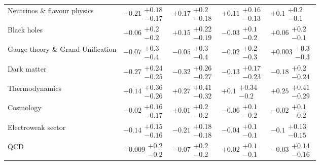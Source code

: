 \begin{table}[H]
\begin{tabular}{lllll}
Neutrinos \& flavour physics & $\bm{+0.21}\substack{+0.18 \\ -0.17}$ & $+0.17\substack{+0.2 \\ -0.18}$ & $+0.11\substack{+0.16 \\ -0.13}$ & $+0.1\substack{+0.2 \\ -0.1}$ \\
Black holes & $+0.06\substack{+0.2 \\ -0.2}$ & $+0.15\substack{+0.22 \\ -0.19}$ & $-0.03\substack{+0.1 \\ -0.2}$ & $+0.06\substack{+0.2 \\ -0.1}$ \\
Gauge theory \& Grand Unification & $-0.07\substack{+0.3 \\ -0.4}$ & $-0.05\substack{+0.3 \\ -0.4}$ & $-0.02\substack{+0.2 \\ -0.3}$ & $+0.003\substack{+0.3 \\ -0.3}$ \\
Dark matter & $\bm{-0.27}\substack{+0.24 \\ -0.25}$ & $\bm{-0.32}\substack{+0.26 \\ -0.27}$ & $-0.13\substack{+0.17 \\ -0.23}$ & $-0.18\substack{+0.2 \\ -0.24}$ \\
Thermodynamics & $+0.14\substack{+0.36 \\ -0.26}$ & $+0.27\substack{+0.41 \\ -0.32}$ & $+0.1\substack{+0.34 \\ -0.2}$ & $+0.25\substack{+0.41 \\ -0.29}$ \\
Cosmology & $-0.02\substack{+0.16 \\ -0.17}$ & $+0.01\substack{+0.2 \\ -0.2}$ & $-0.06\substack{+0.1 \\ -0.2}$ & $-0.02\substack{+0.1 \\ -0.2}$ \\
Electroweak sector & $-0.14\substack{+0.15 \\ -0.16}$ & $\bm{-0.21}\substack{+0.18 \\ -0.18}$ & $-0.04\substack{+0.1 \\ -0.1}$ & $-0.1\substack{+0.13 \\ -0.15}$ \\
QCD & $-0.009\substack{+0.2 \\ -0.2}$ & $-0.07\substack{+0.2 \\ -0.2}$ & $+0.02\substack{+0.1 \\ -0.1}$ & $-0.03\substack{+0.14 \\ -0.16}$ \\

\end{tabular}
\end{table}
